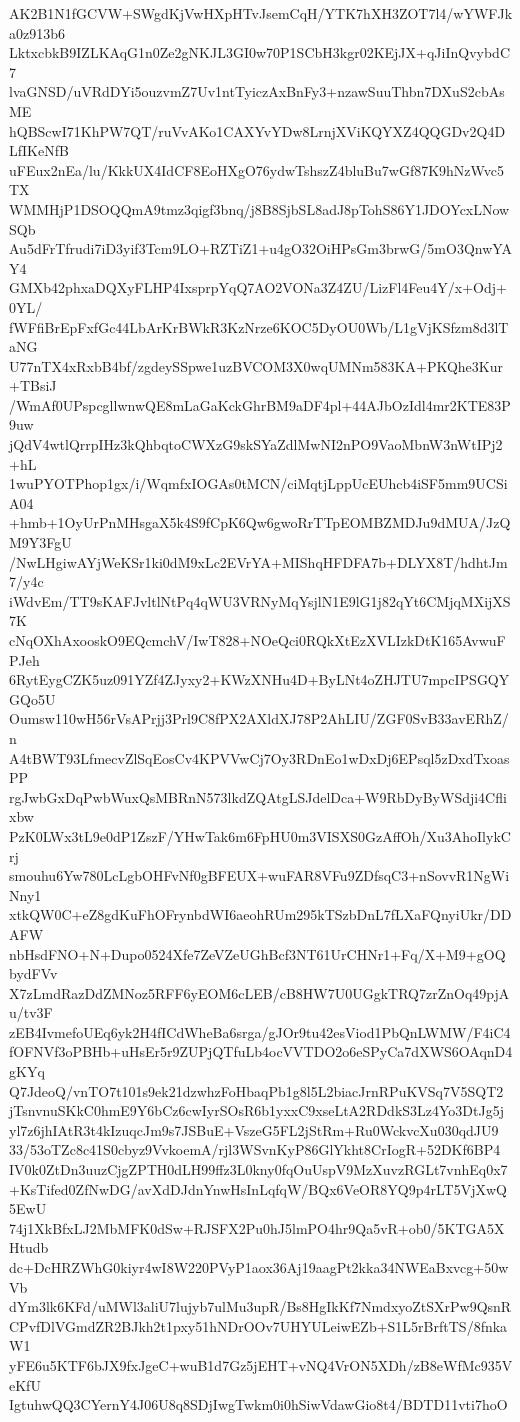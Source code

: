 AK2B1N1fGCVW+SWgdKjVwHXpHTvJsemCqH/YTK7hXH3ZOT7l4/wYWFJka0z913b6
LktxcbkB9IZLKAqG1n0Ze2gNKJL3GI0w70P1SCbH3kgr02KEjJX+qJiInQvybdC7
lvaGNSD/uVRdDYi5ouzvmZ7Uv1ntTyiczAxBnFy3+nzawSuuThbn7DXuS2cbAsME
hQBScwI71KhPW7QT/ruVvAKo1CAXYvYDw8LrnjXViKQYXZ4QQGDv2Q4DLfIKeNfB
uFEux2nEa/lu/KkkUX4IdCF8EoHXgO76ydwTshszZ4bluBu7wGf87K9hNzWvc5TX
WMMHjP1DSOQQmA9tmz3qigf3bnq/j8B8SjbSL8adJ8pTohS86Y1JDOYcxLNowSQb
Au5dFrTfrudi7iD3yif3Tcm9LO+RZTiZ1+u4gO32OiHPsGm3brwG/5mO3QnwYAY4
GMXb42phxaDQXyFLHP4IxsprpYqQ7AO2VONa3Z4ZU/LizFl4Feu4Y/x+Odj+0YL/
fWFfiBrEpFxfGc44LbArKrBWkR3KzNrze6KOC5DyOU0Wb/L1gVjKSfzm8d3lTaNG
U77nTX4xRxbB4bf/zgdeySSpwe1uzBVCOM3X0wqUMNm583KA+PKQhe3Kur+TBsiJ
/WmAf0UPspcgllwnwQE8mLaGaKckGhrBM9aDF4pl+44AJbOzIdl4mr2KTE83P9uw
jQdV4wtlQrrpIHz3kQhbqtoCWXzG9skSYaZdlMwNI2nPO9VaoMbnW3nWtIPj2+hL
1wuPYOTPhop1gx/i/WqmfxIOGAs0tMCN/ciMqtjLppUcEUhcb4iSF5mm9UCSiA04
+hmb+1OyUrPnMHsgaX5k4S9fCpK6Qw6gwoRrTTpEOMBZMDJu9dMUA/JzQM9Y3FgU
/NwLHgiwAYjWeKSr1ki0dM9xLc2EVrYA+MIShqHFDFA7b+DLYX8T/hdhtJm7/y4c
iWdvEm/TT9sKAFJvltlNtPq4qWU3VRNyMqYsjlN1E9lG1j82qYt6CMjqMXijXS7K
cNqOXhAxooskO9EQcmchV/IwT828+NOeQci0RQkXtEzXVLIzkDtK165AvwuFPJeh
6RytEygCZK5uz091YZf4ZJyxy2+KWzXNHu4D+ByLNt4oZHJTU7mpcIPSGQYGQo5U
Oumsw110wH56rVsAPrjj3Prl9C8fPX2AXldXJ78P2AhLIU/ZGF0SvB33avERhZ/n
A4tBWT93LfmecvZlSqEosCv4KPVVwCj7Oy3RDnEo1wDxDj6EPsql5zDxdTxoasPP
rgJwbGxDqPwbWuxQsMBRnN573lkdZQAtgLSJdelDca+W9RbDyByWSdji4Cflixbw
PzK0LWx3tL9e0dP1ZszF/YHwTak6m6FpHU0m3VISXS0GzAffOh/Xu3AhoIlykCrj
smouhu6Yw780LcLgbOHFvNf0gBFEUX+wuFAR8VFu9ZDfsqC3+nSovvR1NgWiNny1
xtkQW0C+eZ8gdKuFhOFrynbdWI6aeohRUm295kTSzbDnL7fLXaFQnyiUkr/DDAFW
nbHsdFNO+N+Dupo0524Xfe7ZeVZeUGhBcf3NT61UrCHNr1+Fq/X+M9+gOQbydFVv
X7zLmdRazDdZMNoz5RFF6yEOM6cLEB/cB8HW7U0UGgkTRQ7zrZnOq49pjAu/tv3F
zEB4IvmefoUEq6yk2H4fICdWheBa6srga/gJOr9tu42esViod1PbQnLWMW/F4iC4
fOFNVf3oPBHb+uHsEr5r9ZUPjQTfuLb4ocVVTDO2o6eSPyCa7dXWS6OAqnD4gKYq
Q7JdeoQ/vnTO7t101s9ek21dzwhzFoHbaqPb1g8l5L2biacJrnRPuKVSq7V5SQT2
jTsnvnuSKkC0hmE9Y6bCz6cwIyrSOsR6b1yxxC9xseLtA2RDdkS3Lz4Yo3DtJg5j
yl7z6jhIAtR3t4kIzuqcJm9s7JSBuE+VszeG5FL2jStRm+Ru0WckvcXu030qdJU9
33/53oTZc8c41S0cbyz9VvkoemA/rjl3WSvnKyP86GlYkht8CrIogR+52DKf6BP4
IV0k0ZtDn3uuzCjgZPTH0dLH99ffz3L0kny0fqOuUspV9MzXuvzRGLt7vnhEq0x7
+KsTifed0ZfNwDG/avXdDJdnYnwHsInLqfqW/BQx6VeOR8YQ9p4rLT5VjXwQ5EwU
74j1XkBfxLJ2MbMFK0dSw+RJSFX2Pu0hJ5lmPO4hr9Qa5vR+ob0/5KTGA5XHtudb
dc+DcHRZWhG0kiyr4wI8W220PVyP1aox36Aj19aagPt2kka34NWEaBxvcg+50wVb
dYm3lk6KFd/uMWl3aliU7lujyb7ulMu3upR/Bs8HgIkKf7NmdxyoZtSXrPw9QsnR
CPvfDlVGmdZR2BJkh2t1pxy51hNDrOOv7UHYULeiwEZb+S1L5rBrftTS/8fnkaW1
yFE6u5KTF6bJX9fxJgeC+wuB1d7Gz5jEHT+vNQ4VrON5XDh/zB8eWfMc935VeKfU
IgtuhwQQ3CYernY4J06U8q8SDjIwgTwkm0i0hSiwVdawGio8t4/BDTD11vti7hoO
